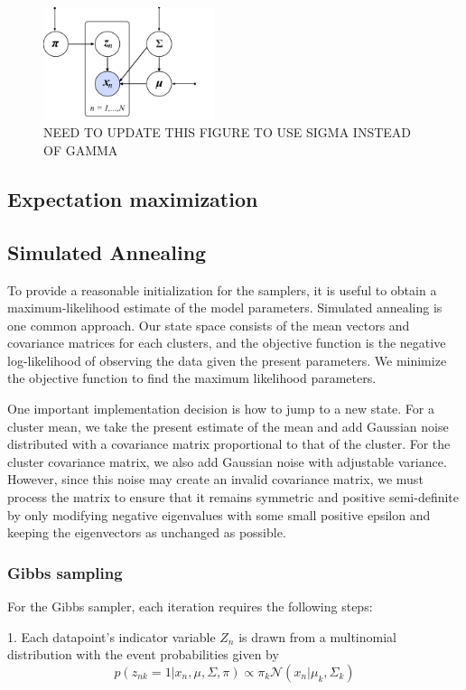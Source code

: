 \documentclass[twoside]{article}
\theoremstyle{theorem}
\theoremstyle{theorem}
\theoremstyle{theorem}
\theoremstyle{lemma}
\theoremstyle{definition}
\theoremstyle{example}
\begin{document}
\begin{figure}
\begin{center}
\includegraphics[width=50mm]{graph_model}
\caption{NEED TO UPDATE THIS FIGURE TO USE SIGMA INSTEAD OF GAMMA}
\end{center}
\end{figure}

\subsection{Expectation maximization}
\subsection{Simulated Annealing}

To provide a reasonable initialization for the samplers, it is useful to obtain a maximum-likelihood estimate of the model parameters. Simulated annealing is one common approach.  Our state space consists of the mean vectors and covariance matrices for each clusters, and the objective function is the negative log-likelihood of observing the data given the present parameters. We minimize the objective function to find the maximum likelihood parameters.

One important implementation decision is how to jump to a new state. For a cluster mean, we take the present estimate of the mean and add Gaussian noise distributed with a covariance matrix proportional to that of the cluster. For the cluster covariance matrix, we also add Gaussian noise with adjustable variance. However, since this noise may create an invalid covariance matrix, we must process the matrix to ensure that it remains symmetric and positive semi-definite by only modifying negative eigenvalues with some small positive epsilon and keeping the eigenvectors as unchanged as possible.

\subsubsection{Gibbs sampling}
For the Gibbs sampler, each iteration requires the following steps: 

1. Each datapoint's indicator variable $Z_n$ is drawn from a multinomial distribution with the event probabilities given by 
\begin{equation}
p(z_{nk} = 1| x_n, \mu, \Sigma, \pi)  \propto \pi_k \mathcal{N}(x_n | \mu_k, \Sigma_k)\end{equation}
\end{document}
